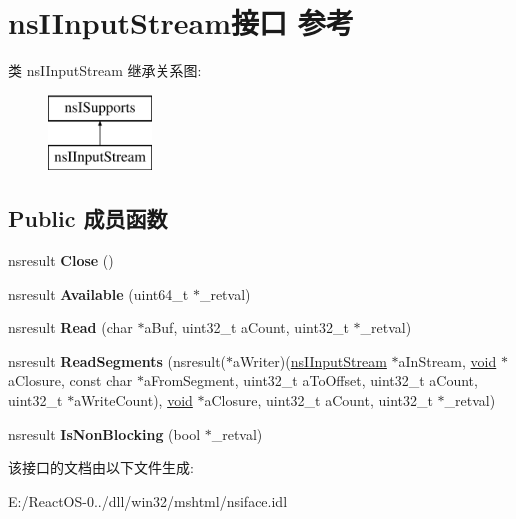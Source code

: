 \hypertarget{interfacens_i_input_stream}{}\section{ns\+I\+Input\+Stream接口 参考}
\label{interfacens_i_input_stream}
类 ns\+I\+Input\+Stream 继承关系图\+:\begin{figure}[H]
\begin{center}
\leavevmode
\includegraphics[height=2.000000cm]{interfacens_i_input_stream}
\end{center}
\end{figure}
\subsection*{Public 成员函数}
\begin{DoxyCompactItemize}
\item 
\mbox{\label{interfacens_i_input_stream_afbbc9d265d71deb5618f96ae7c6d35ef}} 
nsresult {\bfseries Close} ()
\item 
\mbox{\label{interfacens_i_input_stream_a7ac1826d5eb48b642d20699e98f09981}} 
nsresult {\bfseries Available} (uint64\+\_\+t $\ast$\+\_\+retval)
\item 
\mbox{\label{interfacens_i_input_stream_ad5f223b89c10735acf47375ec3e8619a}} 
nsresult {\bfseries Read} (char $\ast$a\+Buf, uint32\+\_\+t a\+Count, uint32\+\_\+t $\ast$\+\_\+retval)
\item 
\mbox{\label{interfacens_i_input_stream_a27f4e260eecdab511abaebc0d46c6ce1}} 
nsresult {\bfseries Read\+Segments} (nsresult($\ast$a\+Writer)(\hyperlink{interfacens_i_input_stream}{ns\+I\+Input\+Stream} $\ast$a\+In\+Stream, \hyperlink{interfacevoid}{void} $\ast$a\+Closure, const char $\ast$a\+From\+Segment, uint32\+\_\+t a\+To\+Offset, uint32\+\_\+t a\+Count, uint32\+\_\+t $\ast$a\+Write\+Count), \hyperlink{interfacevoid}{void} $\ast$a\+Closure, uint32\+\_\+t a\+Count, uint32\+\_\+t $\ast$\+\_\+retval)
\item 
\mbox{\label{interfacens_i_input_stream_a13bfce1e661ade773237ec9ed764695e}} 
nsresult {\bfseries Is\+Non\+Blocking} (bool $\ast$\+\_\+retval)
\end{DoxyCompactItemize}


该接口的文档由以下文件生成\+:\begin{DoxyCompactItemize}
\item 
E\+:/\+React\+O\+S-\/0../dll/win32/mshtml/nsiface.\+idl\end{DoxyCompactItemize}
